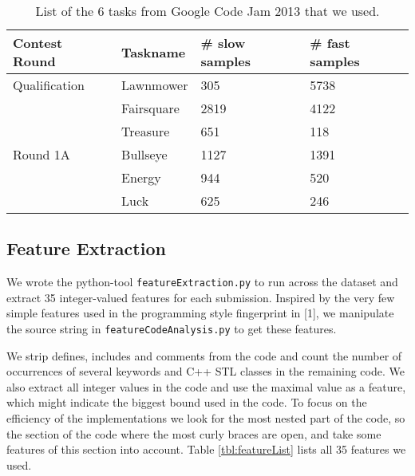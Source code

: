 \begin{table}
\caption{List of the 6 tasks from Google Code Jam 2013 that we used.}
\label{tbl:taskList}
\begin{center}
\begin{tabular}{|l|l|l|l|}
\hline
Contest Round & Taskname & \# slow samples & \# fast samples \\
\hline
Qualification & Lawnmower &	305 &	5738\\
& Fairsquare &	2819	 & 4122\\
& Treasure	& 651 & 	118\\
\hline
Round 1A & Bullseye	&  1127	 & 1391\\
& Energy	 & 944 & 	520\\
& Luck & 	625 & 	246\\
\hline
\end{tabular}
\end{center}
\end{table}

\subsection*{Feature Extraction}
We wrote the python-tool \texttt{featureExtraction.py} to run across the dataset and extract 35 integer-valued features for each submission.
Inspired by the very few simple features used in the programming style fingerprint in [1], we manipulate the source string in \texttt{featureCodeAnalysis.py} to get these features.

We strip defines, includes and comments from the code and count the number of occurrences of several keywords and C++ STL classes in the remaining code.
We also extract all integer values in the code and use the maximal value as a feature, which might indicate the biggest bound used in the code.
To focus on the efficiency of the implementations we look for the most nested part of the code, so the section of the code where the most curly braces are open, and take some features of this section into account. Table \ref{tbl:featureList} lists all 35 features we used.

